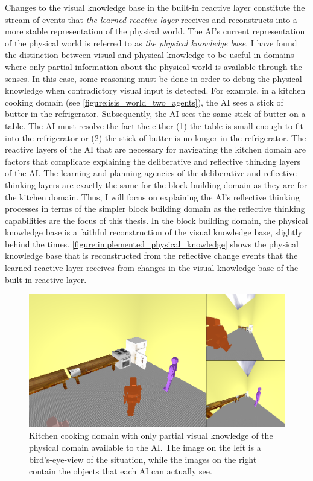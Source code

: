 Changes to the visual knowledge base in the built-in reactive layer
constitute the stream of events that \emph{the learned reactive layer}
receives and reconstructs into a more stable representation of the
physical world.  The AI's current representation of the physical world
is referred to as \emph{the physical knowledge base}.  I have found
the distinction between visual and physical knowledge to be useful in
domains where only partial information about the physical world is
available through the senses.  In this case, some reasoning must be
done in order to debug the physical knowledge when contradictory
visual input is detected.  For example, in a kitchen cooking domain
(see {\mbox{\autoref{figure:isis_world_two_agents}}}), the AI sees a
stick of butter in the refrigerator.  Subsequently, the AI sees the
same stick of butter on a table.  The AI must resolve the fact the
either (1) the table is small enough to fit into the refrigerator or
(2) the stick of butter is no longer in the refrigerator.  The
reactive layers of the AI that are necessary for navigating the
kitchen domain are factors that complicate explaining the deliberative
and reflective thinking layers of the AI.  The learning and planning
agencies of the deliberative and reflective thinking layers are
exactly the same for the block building domain as they are for the
kitchen domain.  Thus, I will focus on explaining the AI's reflective
thinking processes in terms of the simpler block building domain as
the reflective thinking capabilities are the focus of this thesis.  In
the block building domain, the physical knowledge base is a faithful
reconstruction of the visual knowledge base, slightly behind the
times.  {\mbox{\autoref{figure:implemented_physical_knowledge}}} shows
the physical knowledge base that is reconstructed from the reflective
change events that the learned reactive layer receives from changes in
the visual knowledge base of the built-in reactive layer.
\begin{figure}
\begin{center}
\includegraphics[width=12cm]{gfx/isis_world_two_agents}
\end{center}
\caption[Kitchen cooking domain with partial visual knowledge of the
  physical domain.]{Kitchen cooking domain with only partial visual
  knowledge of the physical domain available to the AI.  The image on
  the left is a bird's-eye-view of the situation, while the images on
  the right contain the objects that each AI can actually see.}
\label{figure:isis_world_two_agents}
\end{figure}
